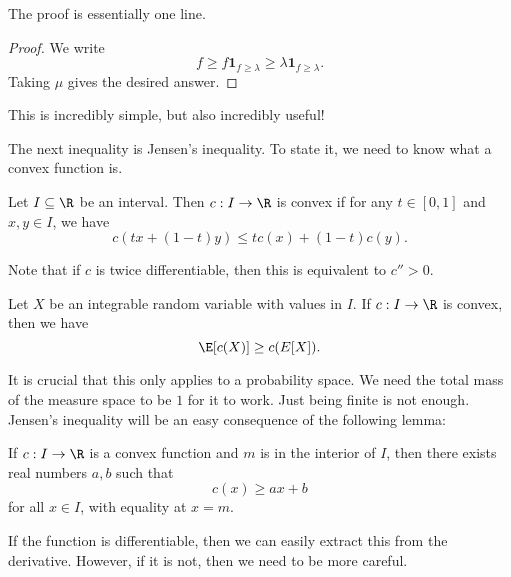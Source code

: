 \documentclass[a4paper]{article}
\begin{document}
The proof is essentially one line.
\begin{proof}
  We write
  \[
    f \geq f \mathbf{1}_{f \geq \lambda} \geq \lambda \mathbf{1}_{f \geq \lambda}.
  \]
  Taking $\mu$ gives the desired answer.
\end{proof}
This is incredibly simple, but also incredibly useful!

The next inequality is Jensen's inequality. To state it, we need to know what a convex function is.
\begin{defi}
  Let $I \subseteq \R$ be an interval. Then $c: I \to \R$ is convex if for any $t \in [0, 1]$ and $x, y \in I$, we have
  \[
    c(tx + (1 - t)y) \leq t c(x) + (1 - t) c(y).
  \]
  \begin{center}
  \end{center}
\end{defi}
Note that if $c$ is twice differentiable, then this is equivalent to $c'' > 0$.

\begin{prop}
  Let $X$ be an integrable random variable with values in $I$. If $c: I \to \R$ is convex, then we have
  \[
    \E[c(X)] \geq c(E[X]).
  \]
\end{prop}
It is crucial that this only applies to a probability space. We need the total mass of the measure space to be $1$ for it to work. Just being finite is not enough. Jensen's inequality will be an easy consequence of the following lemma:
\begin{lemma}
  If $c: I \to \R$ is a convex function and $m$ is in the interior of $I$, then there exists real numbers $a, b$ such that
  \[
    c(x) \geq ax + b
  \]
  for all $x \in I$, with equality at $x = m$.
  \begin{center}
  \end{center}
\end{lemma}
If the function is differentiable, then we can easily extract this from the derivative. However, if it is not, then we need to be more careful.
\end{document}

